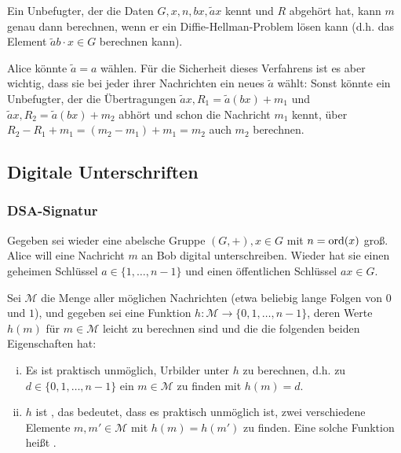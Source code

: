 \begin{bem}
	Ein Unbefugter, der die Daten $G, x, n, bx, \tilde{a}x$ kennt und $R$ abgehört hat, kann $m$ genau dann berechnen, wenn er ein Diffie-Hellman-Problem lösen kann (d.h. das Element $\tilde{a}b \cdot x \in G$ berechnen kann).
\end{bem}

\begin{bem}
	Alice könnte $\tilde{a} = a$ wählen. 
	Für die Sicherheit dieses Verfahrens ist es aber wichtig, dass sie bei jeder ihrer Nachrichten ein neues $\tilde{a}$ wählt: Sonst könnte ein Unbefugter, der die Übertragungen $\tilde{a}x, R_1 = \tilde{a}(bx) + m_1$ und $\tilde{a}x, R_2 = \tilde{a}(bx) + m_2$ abhört und schon die Nachricht $m_1$ kennt, über $R_2 - R_1 + m_1 = (m_2 - m_1) + m_1 = m_2$ auch $m_2$ berechnen.
\end{bem}

\newpage
\subsection{Digitale Unterschriften}
\subsubsection{DSA-Signatur}
\label{sub:1.3}
\label{subsub:1.3.1}
	Gegeben sei wieder eine abelsche Gruppe $(G,+), x \in G$ mit $n = \operatorname{ord}(x)$ groß. 
	Alice will eine Nachricht $m$ an Bob digital unterschreiben. 
	Wieder hat sie einen geheimen Schlüssel $a \in \{1, \dots, n-1\}$ und einen öffentlichen Schlüssel $ax \in G$.
	
\begin{defn}[Hashfunktion]
	Sei $\mathcal{M}$ die Menge aller möglichen Nachrichten (etwa beliebig lange Folgen von $0$ und $1$), und gegeben sei eine Funktion $h \colon \mathcal{M} \rightarrow \{0,1,\dots,n-1\}$, deren Werte $h(m)$ für $m \in \mathcal{M}$ leicht zu berechnen sind und die die folgenden beiden Eigenschaften hat:
	\begin{enumerate}[(i)]
		\item Es ist praktisch unmöglich, Urbilder unter $h$ zu berechnen, d.h. zu $d \in \{0,1,\dots,n-1\}$ ein $m \in \mathcal{M}$ zu finden mit $h(m) = d$.
		\item $h$ ist , das bedeutet, dass es praktisch unmöglich ist, zwei verschiedene Elemente $m, m' \in \mathcal{M}$ mit $h(m) = h(m')$ zu finden. 
		Eine solche Funktion heißt .
	\end{enumerate}
\end{defn}

